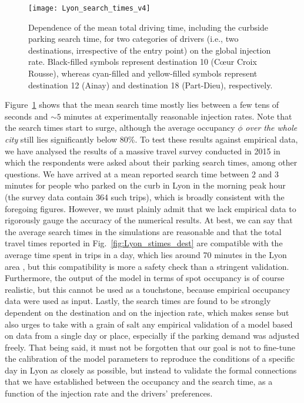 \documentclass[trsc,reprint]{informs3}
\newcommand{\AN}[1]{#1}
\begin{document}
\begin{figure}[!htb]
    \centering
 
        \texttt{[image: Lyon\_search\_times\_v4]}
\caption{Dependence of the mean total driving time, including the curbside parking search time, for two categories of drivers (i.e., two destinations, irrespective of the entry point) on the global injection rate. Black-filled symbols represent destination 10 (C{\oe}ur Croix Rousse), whereas cyan-filled and yellow-filled symbols represent destination 12 (Ainay) and destination 18 (Part-Dieu), respectively.}
\label{fig:searchtimes_Lyon}
\end{figure}


Figure~\ref{fig:searchtimes_Lyon} shows that the mean search time mostly lies between a few tens of seconds and $\sim 5$ minutes at experimentally reasonable injection rates. 
\AN{Note that the search times start to surge, although the average occupancy $\phi$ \emph{over the whole city} still lies significantly
below 80\%.}
\AN{To test these results against empirical data,} we have analysed the results of a massive travel survey conducted in 2015 \citep{Cerema2015EMD} 
\AN{in which the respondents were asked about their parking search times, among other questions. We have} arrived at a mean reported search time  between 2 and 3 minutes for people who parked on the curb in Lyon in the morning peak hour (the survey data contain 364 such trips), which is broadly consistent with the foregoing figures.
However, we must plainly admit that we lack empirical data to rigorously gauge the accuracy of the numerical results. At best, we can say that the average search times in the simulations are reasonable and that the total travel times reported in Fig.~\ref{fig:Lyon_stimes_dest} are compatible with the
average time spent in trips in a day, which lies around 70 minutes in the Lyon area \citep{Scot2018}, but 
this compatibility is more a safety check than a stringent validation. Furthermore, the output of the model in terms of spot occupancy is of course realistic, but this cannot be used as a touchstone, because empirical occupancy data were used as input. Lastly, the search times are found to be strongly dependent on the destination and on the injection rate, which makes sense but also urges to take with a grain of salt any empirical validation of a model based on data from a single day or place, especially if the parking demand was adjusted freely. That being said, it must not be forgotten that 
our goal is not to fine-tune the calibration of the model parameters to reproduce the conditions of a specific day in Lyon as closely as possible, but instead to validate the formal connections that we have established between the occupancy and the search time, as a function of the injection rate and the drivers' preferences.
\end{document}
